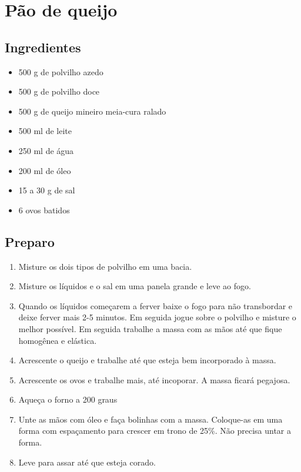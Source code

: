 \section{Pão de queijo}

\subsection*{Ingredientes}
\begin{itemize}
\item 500 g de polvilho azedo
\item 500 g de polvilho doce
\item 500 g de queijo mineiro meia-cura ralado
\item 500 ml de leite
\item 250 ml de água
\item 200 ml de óleo
\item 15 a 30 g de sal
\item 6 ovos batidos
\end{itemize}

\subsection*{Preparo}

\begin{enumerate}
\item Misture os dois tipos de polvilho em uma bacia.
\item Misture os líquidos e o sal em uma panela grande e leve ao fogo.
\item Quando os líquidos começarem a ferver baixe o fogo para não transbordar e deixe ferver mais 2-5 minutos. Em seguida jogue sobre o polvilho e misture o melhor possível. Em seguida trabalhe a massa com as mãos até que fique homogênea e elástica.
\item Acrescente o queijo e trabalhe até que esteja bem incorporado à massa.
\item Acrescente os ovos e trabalhe mais, até incoporar. A massa ficará pegajosa.
\item Aqueça o forno a 200 graus
\item Unte as mãos com óleo e faça bolinhas com a massa. Coloque-as em uma forma com espaçamento para crescer em trono de 25\%. Não precisa untar a forma.
\item Leve para assar até que esteja corado.
\end{enumerate}

